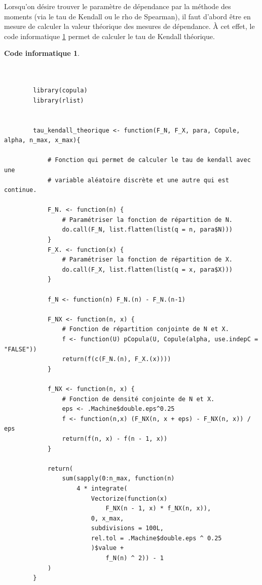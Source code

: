 \documentclass{article}
\newtheorem{code}{Code informatique}
\begin{document}
 	Lorsqu'on désire trouver le paramètre de dépendance par la méthode des moments (via le tau de Kendall ou le rho de Spearman), il faut d'abord être en mesure de calculer la valeur théorique des mesures de dépendance. À cet effet, le code informatique \ref{code_Kendall_theorique} permet de calculer le tau de Kendall théorique.
 	\begin{code}\label{code_Kendall_theorique}
 		\begin{verbatim}
 		
 		
		library(copula)
		library(rlist)
 		
 		
		tau_kendall_theorique <- function(F_N, F_X, para, Copule, alpha, n_max, x_max){
		
		    # Fonction qui permet de calculer le tau de kendall avec une  
		    # variable aléatoire discrète et une autre qui est continue.
		
		    F_N. <- function(n) {
		        # Paramétriser la fonction de répartition de N.
		        do.call(F_N, list.flatten(list(q = n, para$N)))
		    }
		    F_X. <- function(x) {
		        # Paramétriser la fonction de répartition de X.
		        do.call(F_X, list.flatten(list(q = x, para$X)))
		    }
		
		    f_N <- function(n) F_N.(n) - F_N.(n-1)
		
		    F_NX <- function(n, x) {
		        # Fonction de répartition conjointe de N et X.
		        f <- function(U) pCopula(U, Copule(alpha, use.indepC = "FALSE"))
		        return(f(c(F_N.(n), F_X.(x))))
		    }
		
		    f_NX <- function(n, x) {
		        # Fonction de densité conjointe de N et X.
		        eps <- .Machine$double.eps^0.25
		        f <- function(n,x) (F_NX(n, x + eps) - F_NX(n, x)) / eps
		        return(f(n, x) - f(n - 1, x))
		    }
		
		    return(
		        sum(sapply(0:n_max, function(n)
		            4 * integrate(
		                Vectorize(function(x)
		                    F_NX(n - 1, x) * f_NX(n, x)),
		                0, x_max,
		                subdivisions = 100L,
		                rel.tol = .Machine$double.eps ^ 0.25
		                )$value +
		                    f_N(n) ^ 2)) - 1
		    )
		}
 		\end{verbatim}
 	\end{code}
 	\clearpage
 	
\end{document}
